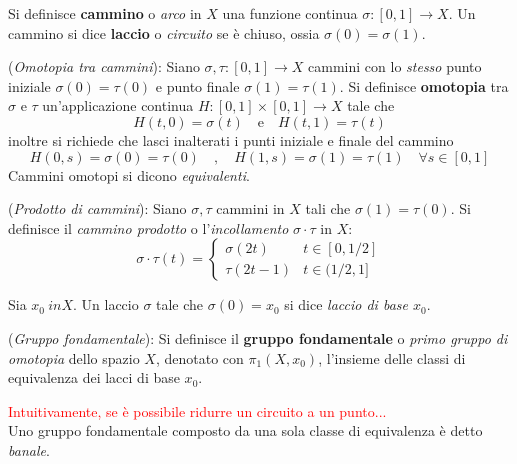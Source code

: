 \begin{definition}
   Si definisce \textbf{cammino} o \emph{arco} in $X$ una funzione continua
   $\sigma : [0,1] \to X$. Un cammino si dice \textbf{laccio} o \emph{circuito}
   se è chiuso, ossia $\sigma(0) = \sigma(1)$.
\end{definition}

\begin{definition}(\emph{Omotopia tra cammini}):
   Siano $\sigma,\tau : [0,1] \to X$ cammini con lo \emph{stesso} punto iniziale
   $\sigma(0) = \tau(0)$ e punto finale $\sigma(1) = \tau(1)$.
   Si definisce \textbf{omotopia} tra $\sigma$ e $\tau$ un'applicazione continua
   $H : [0,1] \times [0,1] \to X$ tale che
      $$ H(t,0) = \sigma(t) \quad \mathrm{e} \quad H(t,1) = \tau(t) $$
   inoltre si richiede che lasci inalterati i punti iniziale e finale del cammino
      $$ H(0,s) = \sigma(0) = \tau(0) \quad , \quad
         H(1,s) = \sigma(1) = \tau(1) \quad \forall s \in [0,1] $$
   Cammini omotopi si dicono \emph{equivalenti}.
\end{definition}

\begin{definition}(\emph{Prodotto di cammini}):
   Siano $\sigma,\tau$ cammini in $X$ tali che $\sigma(1) = \tau(0)$. Si definisce
   il \emph{cammino prodotto} o l'\emph{incollamento} $\sigma \cdot \tau$ in $X$:
   \begin{equation}
      \sigma \cdot \tau (t) = \begin{cases}
         \sigma(2t) & t \in [0,1/2] \\
         \tau(2t-1) & t \in (1/2,1]
      \end{cases}
   \end{equation}
\end{definition}

Sia $x_0\ in X$. Un laccio $\sigma$ tale che $\sigma(0) = x_0$ si dice
\emph{laccio di base $x_0$}.

\begin{definition}(\emph{Gruppo fondamentale}):
   Si definisce il \textbf{gruppo fondamentale} o \emph{primo gruppo di omotopia}
   dello spazio $X$, denotato con $\pi_1(X,x_0)$, l'insieme delle classi di
   equivalenza dei lacci di base $x_0$.
\end{definition}
\textcolor{red}{Intuitivamente, se è possibile ridurre un circuito a un punto...}\\

Uno gruppo fondamentale composto da una sola classe di equivalenza è detto \emph{banale}.

